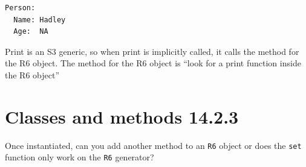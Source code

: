 \documentclass[]{book}
\newenvironment{Shaded}{\begin{snugshade}}{\end{snugshade}}
\newcommand{\CharTok}[1]{\textcolor[rgb]{0.31,0.60,0.02}{#1}}
\newcommand{\ControlFlowTok}[1]{\textcolor[rgb]{0.13,0.29,0.53}{\textbf{#1}}}
\newcommand{\DataTypeTok}[1]{\textcolor[rgb]{0.13,0.29,0.53}{#1}}
\newcommand{\KeywordTok}[1]{\textcolor[rgb]{0.13,0.29,0.53}{\textbf{#1}}}
\newcommand{\NormalTok}[1]{#1}
\newcommand{\OperatorTok}[1]{\textcolor[rgb]{0.81,0.36,0.00}{\textbf{#1}}}
\newcommand{\OtherTok}[1]{\textcolor[rgb]{0.56,0.35,0.01}{#1}}
\newcommand{\StringTok}[1]{\textcolor[rgb]{0.31,0.60,0.02}{#1}}
\begin{document}
\begin{Shaded}
\end{Shaded}

\begin{verbatim}
Person: 
  Name: Hadley
  Age:  NA
\end{verbatim}

Print is an S3 generic, so when print is implicitly called, it calls the method for the R6 object. The method for the R6 object is ``look for a print function inside the R6 object''

\hypertarget{classes-and-methods-14.2.3}{%
\section*{Classes and methods 14.2.3}\label{classes-and-methods-14.2.3}}

Once instantiated, can you add another method to an \texttt{R6} object or does the \texttt{set} function only work on the \texttt{R6} generator?
\end{document}
